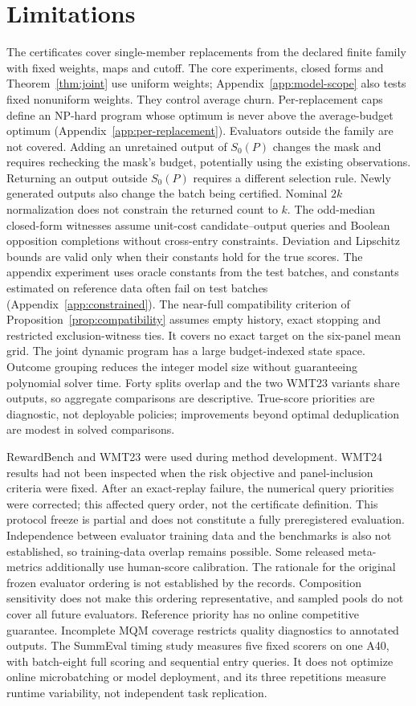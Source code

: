 \documentclass[11pt]{article}
\begin{document}
\section*{Limitations}
The certificates cover single-member replacements from the declared finite family with fixed weights, maps and cutoff. The core experiments, closed forms and Theorem~\ref{thm:joint} use uniform weights; Appendix~\ref{app:model-scope} also tests fixed nonuniform weights. They control average churn. Per-replacement caps define an NP-hard program whose optimum is never above the average-budget optimum (Appendix~\ref{app:per-replacement}). Evaluators outside the family are not covered. Adding an unretained output of $S_0(P)$ changes the mask and requires rechecking the mask's budget, potentially using the existing observations. Returning an output outside $S_0(P)$ requires a different selection rule. Newly generated outputs also change the batch being certified. Nominal $2k$ normalization does not constrain the returned count to $k$. The odd-median closed-form witnesses assume unit-cost candidate--output queries and Boolean opposition completions without cross-entry constraints. Deviation and Lipschitz bounds are valid only when their constants hold for the true scores. The appendix experiment uses oracle constants from the test batches, and constants estimated on reference data often fail on test batches (Appendix~\ref{app:constrained}). The near-full compatibility criterion of Proposition~\ref{prop:compatibility} assumes empty history, exact stopping and restricted exclusion-witness ties. It covers no exact target on the six-panel mean grid. The joint dynamic program has a large budget-indexed state space. Outcome grouping reduces the integer model size without guaranteeing polynomial solver time. Forty splits overlap and the two WMT23 variants share outputs, so aggregate comparisons are descriptive. True-score priorities are diagnostic, not deployable policies; improvements beyond optimal deduplication are modest in solved comparisons.

RewardBench and WMT23 were used during method development. WMT24 results had not been inspected when the risk objective and panel-inclusion criteria were fixed. After an exact-replay failure, the numerical query priorities were corrected; this affected query order, not the certificate definition. This protocol freeze is partial and does not constitute a fully preregistered evaluation. Independence between evaluator training data and the benchmarks is also not established, so training-data overlap remains possible. Some released meta-metrics additionally use human-score calibration. The rationale for the original frozen evaluator ordering is not established by the records. Composition sensitivity does not make this ordering representative, and sampled pools do not cover all future evaluators. Reference priority has no online competitive guarantee. Incomplete MQM coverage restricts quality diagnostics to annotated outputs. The SummEval timing study measures five fixed scorers on one A40, with batch-eight full scoring and sequential entry queries. It does not optimize online microbatching or model deployment, and its three repetitions measure runtime variability, not independent task replication.
\end{document}
